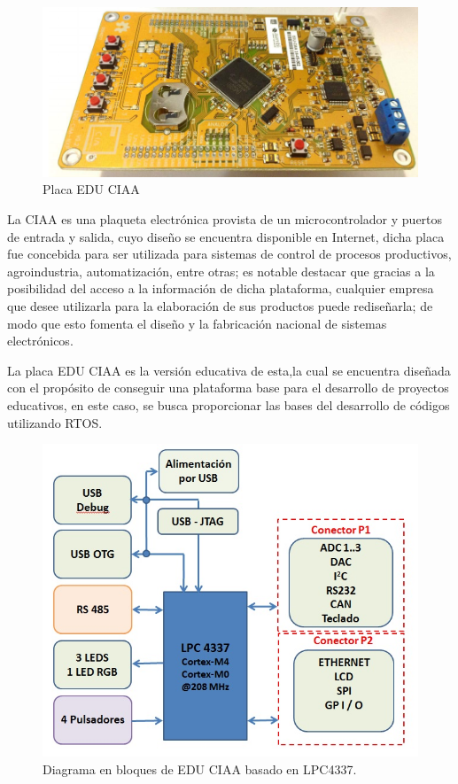 \documentclass[12pt,letterpaper]{article}
\begin{document}
\begin{center}
\begin{figure}[!h]
\centering
\includegraphics[width=10 cm]{figuras/descripcion1.png}
\caption{Placa EDU CIAA}
\label{Fig_placa}
\end{figure}
\end{center}

La CIAA es una plaqueta electrónica provista de un microcontrolador y puertos de entrada y salida, cuyo diseño se encuentra disponible en Internet, dicha placa fue concebida para ser utilizada para sistemas de control de procesos productivos, agroindustria, automatización, entre otras; es notable destacar que gracias a la posibilidad del acceso a la información de dicha plataforma, cualquier empresa que desee utilizarla para la elaboración de sus productos puede rediseñarla; de modo que esto fomenta el diseño y la fabricación nacional de sistemas electrónicos.

La placa EDU CIAA es la versión educativa de esta,la cual se encuentra diseñada con el propósito de conseguir una plataforma base para el desarrollo de proyectos educativos, en este caso, se busca proporcionar las bases del desarrollo de códigos utilizando RTOS.


\begin{figure}[!h]
\centering
\includegraphics[width=8 cm]{figuras/diagramaenbloques.jpg}
\caption{Diagrama en bloques de EDU CIAA basado en LPC4337.}
\label{Fig1}
\end{figure}
\end{document}

